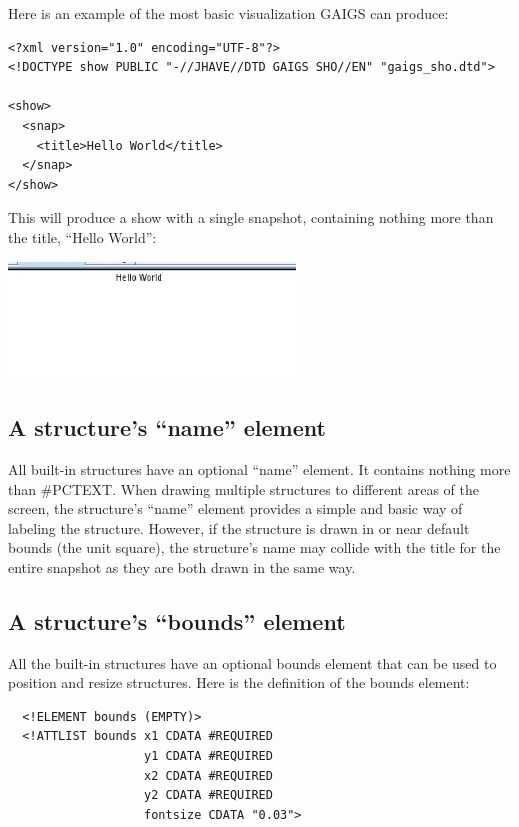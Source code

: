 \documentclass[11pt,letterpaper]{book}
\begin{document}


Here is an example of the most basic visualization GAIGS can produce:

\footnotesize \begin{verbatim}
<?xml version="1.0" encoding="UTF-8"?>
<!DOCTYPE show PUBLIC "-//JHAVE//DTD GAIGS SHO//EN" "gaigs_sho.dtd">

<show>
  <snap>
    <title>Hello World</title>
  </snap>
</show>
\end{verbatim} \normalsize

This will produce a show with a single snapshot, containing nothing more than the title, ``Hello World'':

\begin{center}
  \includegraphics[width=3in]{howto_graphics/helloworld.eps}
\end{center}


\subsection{A structure's ``name'' element}


All built-in structures have an optional ``name'' element. It contains
nothing more than \#PCTEXT. When drawing multiple structures to
different areas of the screen, the structure's ``name'' element
provides a simple and basic way of labeling the structure. However, if
the structure is drawn in or near default bounds (the unit square),
the structure's name may collide with the title for the entire
snapshot as they are both drawn in the same way.



\subsection{A structure's ``bounds'' element}


All the built-in structures have an optional bounds element that can
be used to position and resize structures. Here is the definition of
the bounds element:

\footnotesize \begin{verbatim}
  <!ELEMENT bounds (EMPTY)>
  <!ATTLIST bounds x1 CDATA #REQUIRED
                   y1 CDATA #REQUIRED
                   x2 CDATA #REQUIRED
                   y2 CDATA #REQUIRED
                   fontsize CDATA "0.03">
\end{verbatim} \normalsize
  
\end{document}
